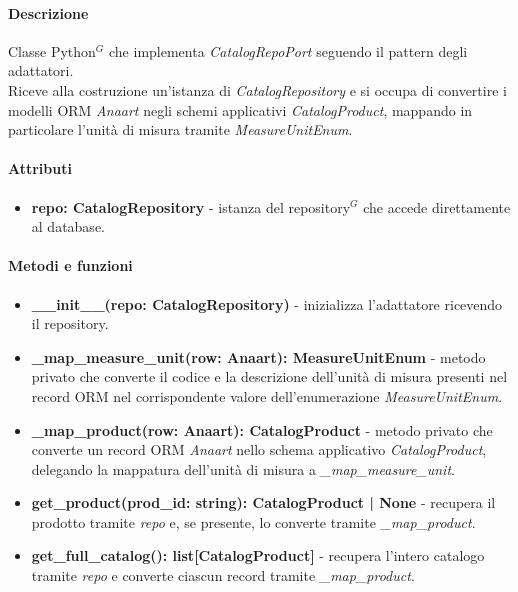 \paragraph{Descrizione}
Classe Python$^G$ che implementa \textit{CatalogRepoPort} seguendo il pattern degli
adattatori.\\
Riceve alla costruzione un'istanza di \textit{CatalogRepository} e si occupa di
convertire i modelli ORM \textit{Anaart} negli schemi applicativi \textit{CatalogProduct},
mappando in particolare l'unità di misura tramite \textit{MeasureUnitEnum}.

\paragraph{Attributi}
\begin{itemize}
	\item \textbf{repo: CatalogRepository} - istanza del repository$^G$ che accede
		direttamente al database.
\end{itemize}

\paragraph{Metodi e funzioni}
\begin{itemize}
	\item \textbf{\_\_init\_\_(repo: CatalogRepository)} - inizializza l'adattatore
		ricevendo il repository.
	\item \textbf{\_map\_measure\_unit(row: Anaart): MeasureUnitEnum} - metodo privato
		che converte il codice e la descrizione dell'unità di misura presenti nel record
		ORM nel corrispondente valore dell'enumerazione \textit{MeasureUnitEnum}.
	\item \textbf{\_map\_product(row: Anaart): CatalogProduct} - metodo privato che
		converte un record ORM \textit{Anaart} nello schema applicativo
		\textit{CatalogProduct}, delegando la mappatura dell'unità di misura a
		\textit{\_map\_measure\_unit}.
	\item \textbf{get\_product(prod\_id: string): CatalogProduct | None} - recupera il
		prodotto tramite \textit{repo} e, se presente, lo converte tramite
		\textit{\_map\_product}.
	\item \textbf{get\_full\_catalog(): list[CatalogProduct]} - recupera l'intero
		catalogo tramite \textit{repo} e converte ciascun record tramite
		\textit{\_map\_product}.
\end{itemize}


